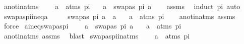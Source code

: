 \begin{isabellebody}
\endisatagproof
{\isafoldproof}%
%
\isadelimproof
\isanewline
%
\endisadelimproof
\isanewline
\isanewline
{}\isamarkupfalse%
\ a{\isacharunderscore}{\kern0pt}not{\isacharunderscore}{\kern0pt}in{\isacharunderscore}{\kern0pt}atms{\isacharcolon}{\kern0pt}\ \isanewline
\ \ \ {\isachardoublequoteopen}a\ {\isasymnotin}\ atms\ pi{\isachardoublequoteclose}\isanewline
\ \ \ {\isachardoublequoteopen}a\ {\isacharequal}{\kern0pt}\ swapas\ pi\ a{\isachardoublequoteclose}\isanewline
%
\isadelimproof
\ \ %
\endisadelimproof
%
\isatagproof
{}\isamarkupfalse%
\ assms\ \isamarkupfalse%
\ {\isacharparenleft}{\kern0pt}induct\ pi{\isacharparenright}{\kern0pt}\ auto%
\endisatagproof
{\isafoldproof}%
%
\isadelimproof
\isanewline
%
\endisadelimproof
\isanewline
\isanewline
{}\isamarkupfalse%
\ swapas{\isacharunderscore}{\kern0pt}pi{\isacharunderscore}{\kern0pt}ineq{\isacharunderscore}{\kern0pt}a{\isacharcolon}{\kern0pt}\ \isanewline
\ \ \ \ {\isachardoublequoteopen}swapas\ pi\ a\ {\isasymnoteq}\ a{\isachardoublequoteclose}\isanewline
\ \ \ {\isachardoublequoteopen}a\ {\isasymin}\ atms\ pi{\isachardoublequoteclose}\isanewline
%
\isadelimproof
\ \ %
\endisadelimproof
%
\isatagproof
{}\isamarkupfalse%
\ a{\isacharunderscore}{\kern0pt}not{\isacharunderscore}{\kern0pt}in{\isacharunderscore}{\kern0pt}atms\ assms\ \isamarkupfalse%
\ force%
\endisatagproof
{\isafoldproof}%
%
\isadelimproof
\isanewline
%
\endisadelimproof
\isanewline
\isanewline
{}\isamarkupfalse%
\ a{\isacharunderscore}{\kern0pt}ineq{\isacharunderscore}{\kern0pt}swapas{\isacharunderscore}{\kern0pt}pi{\isacharcolon}{\kern0pt}\ \isanewline
\ \ \ {\isachardoublequoteopen}a\ {\isasymnoteq}\ swapas\ pi\ a{\isachardoublequoteclose}\isanewline
\ \ \ {\isachardoublequoteopen}a\ {\isasymin}\ atms\ pi{\isachardoublequoteclose}\isanewline
%
\isadelimproof
\ \ %
\endisadelimproof
%
\isatagproof
{}\isamarkupfalse%
\ a{\isacharunderscore}{\kern0pt}not{\isacharunderscore}{\kern0pt}in{\isacharunderscore}{\kern0pt}atms\ assms\ \isamarkupfalse%
\ blast%
\endisatagproof
{\isafoldproof}%
%
\isadelimproof
\isanewline
%
\endisadelimproof
\isanewline
\isanewline
{}\isamarkupfalse%
\ swapas{\isacharunderscore}{\kern0pt}pi{\isacharunderscore}{\kern0pt}in{\isacharunderscore}{\kern0pt}atms{\isacharcolon}{\kern0pt}\ \isanewline
\ \ \ {\isachardoublequoteopen}a\ {\isasymin}\ atms\ pi{\isachardoublequoteclose}\ \isanewline

\end{isabellebody}
